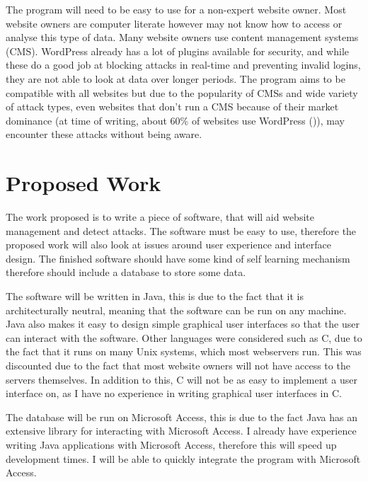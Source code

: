 The program will need to be easy to use for a non-expert website owner. Most website owners are computer literate however may not know how to access or analyse this type of data. Many website owners use content management systems (CMS). WordPress already has a lot of plugins available for security, and while these do a good job at blocking attacks in real-time and preventing invalid logins, they are not able to look at data over longer periods. The program aims to be compatible with all websites but due to the popularity of CMSs and wide variety of attack types, even websites that don't run a CMS  because of their market dominance (at time of writing, about 60\% of websites use WordPress (\cite{IsItWP})), may encounter these attacks without being aware.
\section{Proposed Work}
\label{proposed}
The work proposed is to write a piece of software, that will aid website management and detect attacks. The software must be easy to use, therefore the proposed work will also look at issues around user experience and interface design. The finished software should have some kind of self learning mechanism therefore should include a database to store some data. 

The software will be written in Java, this is due to the fact that it is architecturally neutral, meaning that the software can be run on any machine. Java also makes it easy to design simple graphical user interfaces so that the user can interact with the software. Other languages were considered such as C, due to the fact that it runs on many Unix systems, which most webservers run. This was discounted due to the fact that most website owners will not have access to the servers themselves. In addition to this, C will not be as easy to implement a user interface on, as I have no experience in writing graphical user interfaces in C. 

The database will be run on Microsoft Access, this is due to the fact Java has an extensive library for interacting with Microsoft Access. I already have experience writing Java applications with Microsoft Access, therefore this will speed up development times. I will be able to quickly integrate the program with Microsoft Access. 

